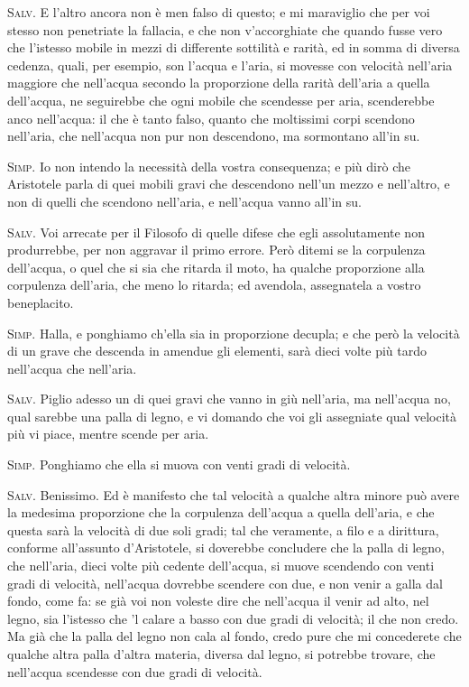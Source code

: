 \documentclass[11pt,twoside,openany]{book}
\newcommand{\speaker}[1]{\textcolor{rubric}{\textsc{#1}}\space}
\begin{document}
\speaker{Salv.} E l'altro ancora non è men falso di questo; e mi maraviglio che per voi stesso non penetriate la fallacia, e che non v'accorghiate che quando fusse vero che l'istesso mobile in mezzi di differente sottilità e rarità, ed in somma di diversa cedenza, quali, per esempio, son l'acqua e l'aria, si movesse con velocità nell'aria maggiore che nell'acqua secondo la proporzione della rarità dell'aria a quella dell'acqua, ne seguirebbe che ogni mobile che scendesse per aria, scenderebbe anco nell'acqua: il che è tanto falso, quanto che moltissimi corpi scendono nell'aria, che nell'acqua non pur non descendono, ma sormontano all'in su.

\speaker{Simp.} Io non intendo la necessità della vostra consequenza; e più dirò che Aristotele parla di quei mobili gravi che descendono nell'un mezzo e nell'altro, e non di quelli che scendono nell'aria, e nell'acqua vanno all'in su.

\speaker{Salv.} Voi arrecate per il Filosofo di quelle difese che egli assolutamente non produrrebbe, per non aggravar il primo errore. Però ditemi se la corpulenza dell'acqua, o quel che si sia che ritarda il moto, ha qualche proporzione alla corpulenza dell'aria, che meno lo ritarda; ed avendola, assegnatela a vostro beneplacito.

\speaker{Simp.} Halla, e ponghiamo ch'ella sia in proporzione decupla; e che però la velocità di un grave che descenda in amendue gli elementi, sarà dieci volte più tardo nell'acqua che nell'aria.

\speaker{Salv.} Piglio adesso un di quei gravi che vanno in giù nell'aria, ma nell'acqua no, qual sarebbe una palla di legno, e vi domando che voi gli assegniate qual velocità più vi piace, mentre scende per aria.

\speaker{Simp.} Ponghiamo che ella si muova con venti gradi di velocità.

\speaker{Salv.} Benissimo. Ed è manifesto che tal velocità a qualche altra minore può avere la medesima proporzione che la corpulenza dell'acqua a quella dell'aria, e che questa sarà la velocità di due soli gradi; tal che veramente, a filo e a dirittura, conforme all'assunto d'Aristotele, si doverebbe concludere che la palla di legno, che nell'aria, dieci volte più cedente dell'acqua, si muove scendendo con venti gradi di velocità, nell'acqua dovrebbe scendere con due, e non venir a galla dal fondo, come fa: se già voi non voleste dire che nell'acqua il venir ad alto, nel legno, sia l'istesso che 'l calare a basso con due gradi di velocità; il che non credo. Ma già che la palla del legno non cala al fondo, credo pure che mi concederete che qualche altra palla d'altra materia, diversa dal legno, si potrebbe trovare, che nell'acqua scendesse con due gradi di velocità.
\end{document}
